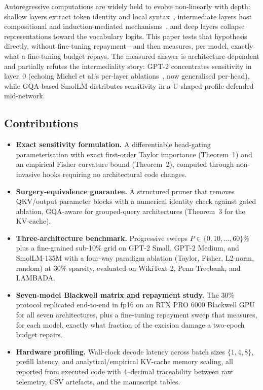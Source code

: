 \documentclass[11pt]{article}
\begin{document}
Autoregressive computations are widely held to evolve non-linearly with depth:
shallow layers extract token identity and local syntax~\cite{khandelwal2019sharp},
intermediate layers host compositional and induction-mediated
mechanisms~\cite{elhage2021mathematical, olsson2022context}, and deep layers collapse
representations toward the vocabulary logits. This paper tests that hypothesis
directly, without fine-tuning repayment---and then measures, per model, exactly
what a fine-tuning budget repays. The measured answer is architecture-dependent and partially
refutes the intermediality story: GPT-2 concentrates sensitivity in layer~0 (echoing
Michel et al.'s per-layer ablations~\cite{michel2019sixteen}, now generalised
per-head), while GQA-based SmolLM distributes sensitivity in a U-shaped profile
defended mid-network.

\subsection{Contributions}
\begin{itemize}
  \item \textbf{Exact sensitivity formulation.} A differentiable head-gating
  parameterisation with exact first-order Taylor importance (Theorem~1) and an
  empirical Fisher curvature bound (Theorem~2), computed through non-invasive
  hooks requiring no architectural code changes.
  \item \textbf{Surgery-equivalence guarantee.} A structured pruner that removes
  QKV/output parameter blocks with a numerical identity check against gated
  ablation, GQA-aware for grouped-query architectures (Theorem~3 for the KV-cache).
  \item \textbf{Three-architecture benchmark.} Progressive sweeps
  $P\in\{0,10,\dots,60\}\%$ plus a fine-grained sub-10\% grid on GPT-2 Small,
  GPT-2 Medium, and SmolLM-135M with a four-way paradigm ablation (Taylor, Fisher,
  L2-norm, random) at $30\%$ sparsity, evaluated on WikiText-2, Penn Treebank,
  and LAMBADA.
  \item \textbf{Seven-model Blackwell matrix and repayment study.} The 30\%
  protocol replicated end-to-end in fp16 on an RTX PRO 6000 Blackwell GPU for
  all seven architectures, plus a fine-tuning repayment sweep that measures,
  for each model, exactly what fraction of the excision damage a two-epoch
  budget repairs.
  \item \textbf{Hardware profiling.} Wall-clock decode latency across batch sizes
  $\{1,4,8\}$, prefill latency, and analytical/empirical KV-cache memory scaling,
  all reported from executed code with 4--decimal traceability between raw
  telemetry, CSV artefacts, and the manuscript tables.
\end{itemize}
\end{document}
